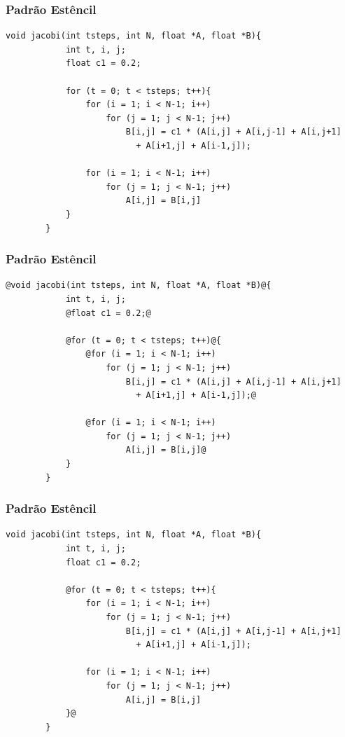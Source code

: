 \documentclass[xcolor={table}]{beamer}
\begin{document}
\begin{frame}[fragile]
    \frametitle{Padrão Estêncil}
    \begin{lstlisting}[style=highlight, gobble=4]
	    void jacobi(int tsteps, int N, float *A, float *B){
		    int t, i, j;
		    float c1 = 0.2;

		    for (t = 0; t < tsteps; t++){
		    	for (i = 1; i < N-1; i++)
		    		for (j = 1; j < N-1; j++)
		    			B[i,j] = c1 * (A[i,j] + A[i,j-1] + A[i,j+1]
                          + A[i+1,j] + A[i-1,j]);

		    	for (i = 1; i < N-1; i++)
		    		for (j = 1; j < N-1; j++)
		    			A[i,j] = B[i,j]
		    }
	    }
    \end{lstlisting}
\end{frame}

\begin{frame}[fragile]
    \frametitle{Padrão Estêncil}
    \begin{lstlisting}[style=base, gobble=4]
	    @void jacobi(int tsteps, int N, float *A, float *B)@{
		    int t, i, j;
		    @float c1 = 0.2;@

		    @for (t = 0; t < tsteps; t++)@{
		    	@for (i = 1; i < N-1; i++)
		    		for (j = 1; j < N-1; j++)
		    			B[i,j] = c1 * (A[i,j] + A[i,j-1] + A[i,j+1]
                          + A[i+1,j] + A[i-1,j]);@

		    	@for (i = 1; i < N-1; i++)
		    		for (j = 1; j < N-1; j++)
		    			A[i,j] = B[i,j]@
		    }
	    }
    \end{lstlisting}
\end{frame}


\begin{frame}[fragile]
    \frametitle{Padrão Estêncil}
    \begin{lstlisting}[style=base, gobble=4]
	    void jacobi(int tsteps, int N, float *A, float *B){
		    int t, i, j;
		    float c1 = 0.2;

		    @for (t = 0; t < tsteps; t++){
		    	for (i = 1; i < N-1; i++)
		    		for (j = 1; j < N-1; j++)
		    			B[i,j] = c1 * (A[i,j] + A[i,j-1] + A[i,j+1]
                          + A[i+1,j] + A[i-1,j]);

		    	for (i = 1; i < N-1; i++)
		    		for (j = 1; j < N-1; j++)
		    			A[i,j] = B[i,j]
		    }@
	    }
    \end{lstlisting}
\end{frame}
\end{document}
